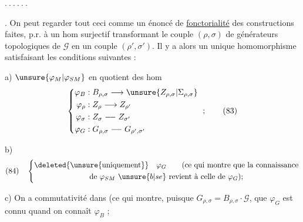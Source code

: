 \hfill $.\ .\ .\ .\ .\ .$ 


. On peut regarder tout ceci comme un énoncé de \uline{fonctorialité} des constructions faites, p.r. à un hom surjectif
transformant le couple $(\rho,\sigma)$ de générateurs topologiques de $\mathcal G$ en un couple $(\rho',\sigma')$.
Il y a alors un unique homomorphisme
satisfaisant les conditions suivantes :

a) $\unsure{\varphi_M|\varphi_{SM}}$  en quotient  des hom
\[
\left\{\begin{aligned}
\varphi_B&:B_{\rho,\sigma}\longrightarrow\unsure{Z_{\rho,\sigma}|\Sigma_{\rho,\sigma}}\\
\varphi_\rho&:Z_\rho\longrightarrow Z_{\rho'}\\
\varphi_\sigma&:Z_\sigma\mathrel{\relbar\joinrel\relbar} Z_{\sigma'}\\
\varphi_G&:G_{\rho,\sigma}\mathrel{\relbar\joinrel\relbar} G_{\rho',\sigma'}
\end{aligned}\right.\ ;\qquad(83)
\]

b) 
\[
(84)\quad\left\{\begin{gathered}
\deleted{\text{\unsure{uniquement}}}\quad\varphi_G\qquad
\text{(ce qui montre que la connaissance}\\
\text{de }\varphi_{SM}\ \unsure{b|se}\ \text{revient à celle de }\varphi_G\text{)};
\end{gathered}\right.
\]

c) On a commutativité dans
(ce qui montre, puisque $G_{\rho,\sigma}=B_{\rho,\sigma}\cdot\mathcal G$, que $\varphi_G$ est connu quand on connaît $\varphi_B$ ;

